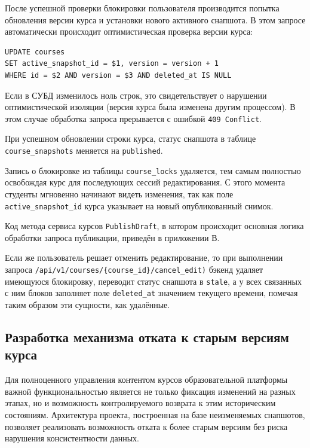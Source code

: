 \documentclass[coursework]{SCWorks}
\begin{document}
После успешной проверки блокировки пользователя производится попытка обновления версии курса и установки нового активного снапшота. В этом запросе автоматически происходит оптимистическая проверка версии курса:

\begin{verbatim}
UPDATE courses
SET active_snapshot_id = $1, version = version + 1
WHERE id = $2 AND version = $3 AND deleted_at IS NULL
\end{verbatim}

Если в СУБД изменилось ноль строк, это свидетельствует о нарушении оптимистической изоляции (версия курса была изменена другим процессом). В этом случае обработка запроса прерывается с ошибкой \texttt{409 Conflict}.

При успешном обновлении строки курса, статус снапшота в таблице \texttt{course\_snapshots} меняется на \texttt{published}.

Запись о блокировке из таблицы \texttt{course\_locks} удаляется, тем самым полностью освобождая курс для последующих сессий редактирования. С этого момента студенты мгновенно начинают видеть изменения, так как поле \texttt{active\_snapshot\_id} курса указывает на новый опубликованный снимок.

Код метода сервиса курсов \texttt{PublishDraft}, в котором происходит основная логика обработки запроса публикации, приведён в приложении В.

Если же пользователь решает отменить редактирование, то при выполнении запроса \texttt{/api/v1/courses/\{course\_id\}/cancel\_edit)} бэкенд удаляет имеющуюся блокировку, переводит статус снапшота в \texttt{stale}, а у всех связанных с ним блоков заполняет поле \texttt{deleted\_at} значением текущего времени, помечая таким образом эти сущности, как удалённые.

\subsection{Разработка механизма отката к старым версиям курса}

Для полноценного управления контентом курсов образовательной платформы важной функциональностью является не только фиксация изменений на разных этапах, но и возможность контролируемого возврата к этим историческим состояниям. Архитектура проекта, построенная на базе неизменяемых снапшотов, позволяет реализовать возможность отката к более старым версиям без риска нарушения консистентности данных.
\end{document}
